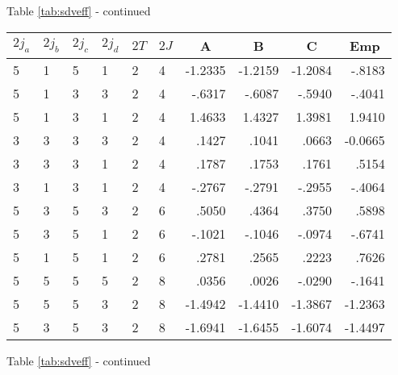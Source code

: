 \begin{center}{Table \ref{tab:sdveff} - continued}\end{center}
\clearpage
\small
\begin{center}
\begin{tabular}{llllllrrrr}
\hline
$2j_{a}$&$2j_{b}$&$2j_{c}$&$2j_{d}$&$2T$&$2J$&
\multicolumn{1}{c}{A}&
\multicolumn{1}{c}{B}&
\multicolumn{1}{c}{C}&
\multicolumn{1}{c}{Emp}\\\hline
  5& 1& 5& 1& 2& 4& -1.2335& -1.2159& -1.2084&-.8183\\
  5& 1& 3& 3& 2& 4&  -.6317&  -.6087&  -.5940&-.4041\\
  5& 1& 3& 1& 2& 4&  1.4633&  1.4327&  1.3981&1.9410\\
  3& 3& 3& 3& 2& 4&   .1427&   .1041&   .0663&-0.0665\\
  3& 3& 3& 1& 2& 4&   .1787&   .1753&   .1761&.5154\\
  3& 1& 3& 1& 2& 4&  -.2767&  -.2791&  -.2955&-.4064\\
  5& 3& 5& 3& 2& 6&   .5050&   .4364&   .3750&.5898\\
  5& 3& 5& 1& 2& 6&  -.1021&  -.1046&  -.0974&-.6741\\
  5& 1& 5& 1& 2& 6&   .2781&   .2565&   .2223&.7626\\
  5& 5& 5& 5& 2& 8&   .0356&   .0026&  -.0290&-.1641\\
  5& 5& 5& 3& 2& 8& -1.4942& -1.4410& -1.3867&-1.2363\\
  5& 3& 5& 3& 2& 8& -1.6941& -1.6455& -1.6074&-1.4497\\
\hline
\end{tabular}
\end{center}
\begin{center}{Table \ref{tab:sdveff} - continued}\end{center}

\clearpage



